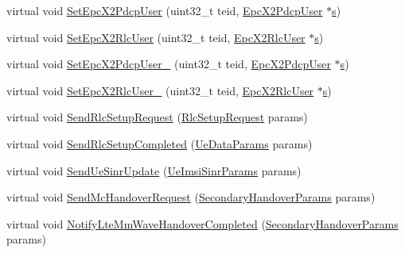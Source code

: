 \begin{DoxyCompactItemize}
\item 
virtual void \hyperlink{classns3_1_1EpcX2SpecificEpcX2SapProvider_abc686ab2b0ba9896262ab8fb3e24d4fc}{Set\+Epc\+X2\+Pdcp\+User} (uint32\+\_\+t teid, \hyperlink{classns3_1_1EpcX2PdcpUser}{Epc\+X2\+Pdcp\+User} $\ast$\hyperlink{generate__test__data__lte__sinr_8m_ad83eeb3a142285d1243a08c6b7026df8}{s})
\item 
virtual void \hyperlink{classns3_1_1EpcX2SpecificEpcX2SapProvider_afdf49e10f6c17ed619293815f19b09c5}{Set\+Epc\+X2\+Rlc\+User} (uint32\+\_\+t teid, \hyperlink{classns3_1_1EpcX2RlcUser}{Epc\+X2\+Rlc\+User} $\ast$\hyperlink{generate__test__data__lte__sinr_8m_ad83eeb3a142285d1243a08c6b7026df8}{s})
\item 
virtual void \hyperlink{classns3_1_1EpcX2SpecificEpcX2SapProvider_a2bf5072678430550b75cb54231330162}{Set\+Epc\+X2\+Pdcp\+User\+\_} (uint32\+\_\+t teid, \hyperlink{classns3_1_1EpcX2PdcpUser}{Epc\+X2\+Pdcp\+User} $\ast$\hyperlink{generate__test__data__lte__sinr_8m_ad83eeb3a142285d1243a08c6b7026df8}{s})
\item 
virtual void \hyperlink{classns3_1_1EpcX2SpecificEpcX2SapProvider_ad3097cb3612bcd356dbc8f9ab01b62ce}{Set\+Epc\+X2\+Rlc\+User\+\_} (uint32\+\_\+t teid, \hyperlink{classns3_1_1EpcX2RlcUser}{Epc\+X2\+Rlc\+User} $\ast$\hyperlink{generate__test__data__lte__sinr_8m_ad83eeb3a142285d1243a08c6b7026df8}{s})
\item 
virtual void \hyperlink{classns3_1_1EpcX2SpecificEpcX2SapProvider_ae525390caef29dde20697b24a67bdf2a}{Send\+Rlc\+Setup\+Request} (\hyperlink{structns3_1_1EpcX2Sap_1_1RlcSetupRequest}{Rlc\+Setup\+Request} params)
\item 
virtual void \hyperlink{classns3_1_1EpcX2SpecificEpcX2SapProvider_a8597fea32a752a4f5a5914d09db38044}{Send\+Rlc\+Setup\+Completed} (\hyperlink{structns3_1_1EpcX2Sap_1_1UeDataParams}{Ue\+Data\+Params} params)
\item 
virtual void \hyperlink{classns3_1_1EpcX2SpecificEpcX2SapProvider_ae668329e760ea9c454ef32650549a2fe}{Send\+Ue\+Sinr\+Update} (\hyperlink{structns3_1_1EpcX2Sap_1_1UeImsiSinrParams}{Ue\+Imsi\+Sinr\+Params} params)
\item 
virtual void \hyperlink{classns3_1_1EpcX2SpecificEpcX2SapProvider_a75ed98523fdbe51653f30362e4213fdf}{Send\+Mc\+Handover\+Request} (\hyperlink{structns3_1_1EpcX2Sap_1_1SecondaryHandoverParams}{Secondary\+Handover\+Params} params)
\item 
virtual void \hyperlink{classns3_1_1EpcX2SpecificEpcX2SapProvider_a0710825966d26ba3a27f0926231f110f}{Notify\+Lte\+Mm\+Wave\+Handover\+Completed} (\hyperlink{structns3_1_1EpcX2Sap_1_1SecondaryHandoverParams}{Secondary\+Handover\+Params} params)

\end{DoxyCompactItemize}
